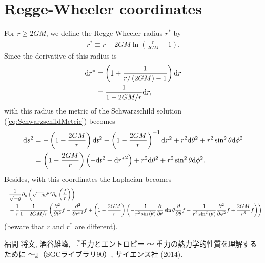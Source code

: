 \documentclass[10pt,onecolumn,dvipdfmx]{article}
\begin{document}
\section{Regge-Wheeler coordinates}
For $r\ge 2GM$, we define the Regge-Wheeler radius $r^* $ by
\begin{align}
r^* \equiv r+2GM\ln{\left( \frac{r}{2GM} -1\right) } .
\end{align}
Since the derivative of this radius is 
\begin{align}
\mathrm{d} r^* &= \left( 1+\frac{1}{r/\left( 2GM\right) -1} \right) \mathrm{d} r\notag \\
&= \frac{1}{1-2GM/r } \mathrm{d} r, 
\end{align}
with this radius the metric of the Schwarzschild solution (\ref{eq:SchwarzschildMetcic}) becomes 
\begin{align}
\mathrm{d} s^2 &=-\left( 1-\frac{2GM}{r} \right) \mathrm{d} t^2 +\left( 1-\frac{2GM}{r} \right) ^{-1} \mathrm{d} r^2 +r^2 \mathrm{d} \theta ^2 +r^2 \sin^2 {\theta } \mathrm{d} \phi ^2 \notag \\
&=\left( 1-\frac{2GM}{r} \right) \left( -\mathrm{d} t^2 +\mathrm{d} {r^* }^{2} \right) +r^2 \mathrm{d} \theta ^2 +r^2 \sin^2 {\theta } \mathrm{d} \phi ^2 .
\end{align}
Besides, with this coordinates the Laplacian becomes 
\begin{align}
&\frac{1}{\sqrt{-g} } \partial _{\mu } \left( \sqrt{-g} g^{\mu \nu } \partial _{\nu } \left( \frac{f}{r} \right) \right) \notag \\
= &-\frac{1}{r} \frac{1}{1-2 G M / r} \left(\frac{\partial^{2}}{\partial t^{2}}  f - \frac{\partial^{2}}{\partial {r^* }^{2}} f+\left(1- \frac{2 G M}{r} \right) \left(- \frac{1}{r^{2} \sin{\left (\theta \right )}} \frac{\partial }{\partial \theta } \sin{\theta } \frac{\partial }{\partial \theta } f- \frac{1}{r^{2} \sin^{2}{\left (\theta \right )}} \frac{\partial^{2}}{\partial \phi ^{2}} f+\frac{2 G M }{r^{3} } f\right) \right) 
\end{align}
(beware that $r$ and $r^* $ are different).

\begin{thebibliography}{9}
 福間 将文, 酒谷雄峰, 『重力とエントロピー 〜 重力の熱力学的性質を理解するために 〜』（SGCライブラリ90）, サイエンス社 (2014).
\end{thebibliography}
\end{document}
